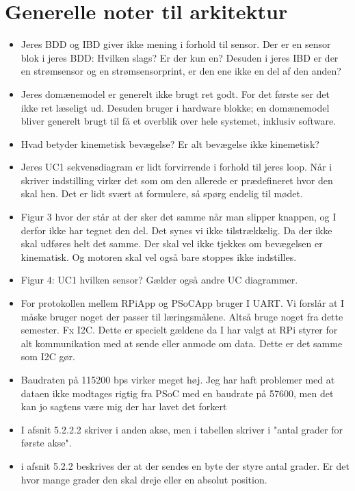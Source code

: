 \documentclass[a4paper,12pt,fleqn,oneside]{article}
\begin{document}
\section{Generelle noter til arkitektur }
\begin{itemize}
\item Jeres BDD og IBD giver ikke mening i forhold til sensor. Der er en sensor blok i jeres BDD: Hvilken slags? Er der kun en? Desuden i jeres IBD er der en strømsensor og en strømsensorprint, er den ene ikke en del af den anden? 
\item Jeres domænemodel er generelt ikke brugt ret godt. For det første ser det ikke ret læseligt ud. Desuden bruger i hardware blokke; en domænemodel bliver generelt brugt til få et overblik over hele systemet, inklusiv software. 
\item Hvad betyder kinemetisk bevægelse? Er alt bevægelse ikke kinemetisk?
\item Jeres UC1 sekvensdiagram er lidt forvirrende i forhold til jeres loop. Når i skriver indstilling virker det som om den allerede er prædefineret hvor den skal hen. Det er lidt svært at formulere, så spørg endelig til mødet. 
\item Figur 3 hvor der står at der sker det samme når man slipper knappen, og I derfor ikke har tegnet den del. Det synes vi ikke tilstrækkelig. Da der ikke skal udføres helt det samme. Der skal vel ikke tjekkes om bevægelsen er kinematisk. Og motoren skal vel også bare stoppes ikke indstilles.
\item  Figur 4: UC1 hvilken sensor? Gælder også andre UC diagrammer. 
\item For protokollen mellem RPiApp og PSoCApp bruger I UART. Vi forslår at I måske bruger noget der passer til læringsmålene. Altså bruge noget fra dette semester. Fx I2C. Dette er specielt gældene da I har valgt at RPi styrer for alt kommunikation med at sende eller anmode om data. Dette er det samme som I2C gør.
\item Baudraten på 115200 bps virker meget høj. Jeg har haft problemer med at dataen ikke modtages rigtig fra PSoC med en baudrate på 57600, men det kan jo sagtens være mig der har lavet det forkert
\item I afsnit 5.2.2.2 skriver i anden akse, men i tabellen skriver i "antal grader for første akse". 
\item i afsnit 5.2.2 beskrives der at der sendes en byte der styre antal grader. Er det hvor mange grader den skal dreje eller en absolut position.
\end{itemize}
\end{document}
